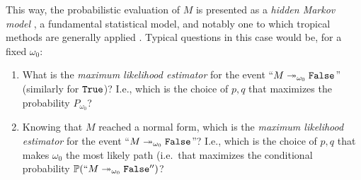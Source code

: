 This way, the probabilistic evaluation of $M$ is presented as a \emph{hidden Markov model} \cite{Baum1966}, a fundamental statistical model, and notably one to which tropical methods are generally applied \cite{Pachter2004}.
Typical questions in this case would be, for a fixed $\omega_0$:
%
\begin{enumerate}
 \item What is the \emph{maximum likelihood estimator} for the event ``$M\twoheadrightarrow_{\omega_0} \mathtt{False}$''  (similarly for $\mathtt{True}$)?
 I.e., which is the choice of $p,q$ that maximizes the probability $P_{\omega_0}$?
 \item 
Knowing that $M$ reached a normal form, %
 which is the \emph{maximum likelihood estimator} for the event ``$M\twoheadrightarrow_{\omega_0}\mathtt{False}$''? %
I.e., which is the choice of $p,q$ that makes $\omega_0$ the most likely path %
(i.e.\ that maximizes the conditional probability $\mathbb{P}(``M\twoheadrightarrow_{\omega_0} \mathtt{False}'')$?%
\end{enumerate}

